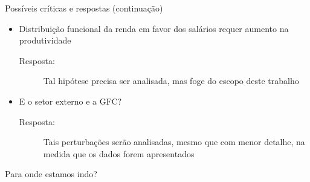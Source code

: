 \documentclass[pdf, xcolor=table]{beamer}
\begin{document}
\begin{frame}{Possíveis críticas e respostas (continuação)}
\begin{itemize}
 \item Distribuição funcional da renda em favor dos salários requer aumento na produtividade
            \begin{description}
            \item[Resposta:] Tal hipótese precisa ser analisada, mas foge do escopo deste trabalho
            \end{description}
        \item E o setor externo e a GFC?
            \begin{description}
            \item[Resposta:] Tais perturbações serão analisadas, mesmo que com menor detalhe, na medida que os dados forem apresentados
            \end{description}
\end{itemize}
\end{frame}

\begin{frame}{Para onde estamos indo?}
\newcommand{\pythagwidth}{3cm}
\newcommand{\pythagheight}{3cm}
    
\end{frame}


\end{document}

